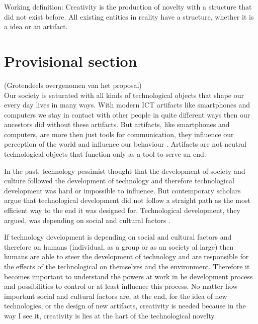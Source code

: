 \documentclass[a4paper]{Thesis}
\begin{document}

Working definition:
Creativity is the production of novelty with a structure that did not exist before.
All existing entities in reality have a structure, whether it is a idea or an artifact.


\section{Provisional section}

(Grotendeels overgenomen van het proposal)\\

Our society is saturated with all kinds of technological objects that shape our every day lives in many ways. With modern ICT artifacts like smartphones and computers we stay in contact with other people in quite different ways then our ancestors did without these artifacts.  But artifacts, like smartphones and computers, are more then just tools for communication, they influence our perception of the world and influence our behaviour \cite{Verbeek2005,verbeek2011moralizing}. Artifacts are not neutral technological objects that function only as a tool to serve an end.

In the past, technology pessimist thought that the development of society and culture followed the development of technology and therefore technological development was hard or impossible to influence. 
But contemporary scholars argue that technological development did not follow a straight path as the most efficient way to the end it was designed for. Technological development, they argued, was depending on social and cultural factors \cite{Bijker1989}.

If technology development is depending on social and cultural factors and therefore on humans (individual, as a group or as an society al large) then humans are able to steer the development of technology and are responsible for the effects of the technological on themselves and the environment.  Therefore it becomes important to understand the powers at work in he development process and possibilities to control or at least influence this process.  
No matter how important social and cultural factors are, at the end, for the idea of new technologies, or the design  of new artifacts, creativity is needed because in the way I see it, creativity is lies at the hart of the technological novelty.
\end{document}
